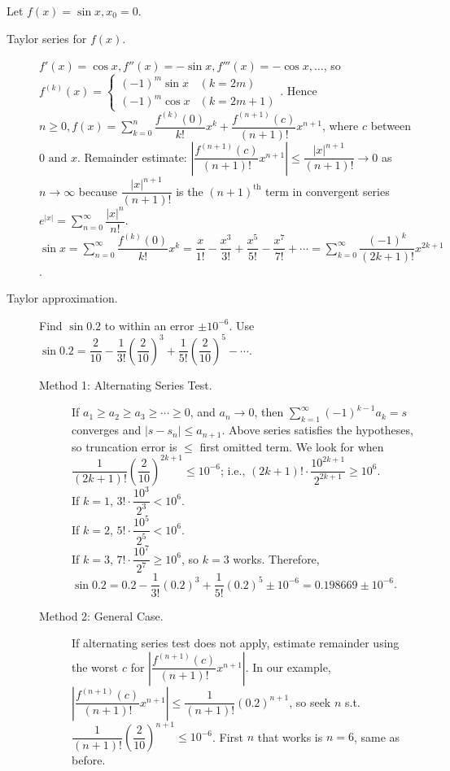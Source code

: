 \begin{example}
	Let $f(x)=\sin{x}, x_0=0$.
	\begin{description}
		\item[Taylor series for $f(x)$.]
		      $f'(x)=\cos{x}, f''(x)=-\sin{x}, f'''(x)=-\cos{x},\ldots $, so
		      $f^{(k)}(x)=\begin{cases}
				      (-1)^{m}\sin{x}  & (k=2m)   \\
				      (-1)^{m} \cos{x} & (k=2m+1)
			      \end{cases}$.
		      Hence $n\ge 0, f(x)= \sum_{k=0}^{n}{\dfrac{f^{(k)}(0)}{k!}}x^{k}+\dfrac{f^{(n+1)}(c)}{(n+1)!}x^{n+1}$, where $c$ between $0 \text{ and } x$.
		      Remainder estimate: $\left|\dfrac{f^{(n+1)}(c)}{(n+1)!}x^{n+1} \right|\le \dfrac{ \left| x \right| ^{n+1} }{(n+1)!} \to 0$ as $n\to \infty$ because $\dfrac{|x|^{n+1}}{(n+1)!}$ is the $(n+1)^{\text{th}}$ term in convergent series $e^{|x|}=\sum_{n=0}^{\infty}{\dfrac{|x|^{n}}{n!}}$.
		      \\$\sin{x}= \sum_{n=0}^{\infty}{\dfrac{f^{(k)}(0)}{k!}x^{k}}=\dfrac{x}{1!}-\dfrac{x^3}{3!}+\dfrac{x^{5}}{5!}-\dfrac{x^{7}}{7!}+ \cdots=\sum_{k=0}^{\infty}{\dfrac{(-1)^{k}}{(2k+1)!}x^{2k+1}}$.
		\item [Taylor approximation.]
		      Find $\sin{0.2}$ to within an error $\pm 10^{-6}$.
		      Use $\sin{0.2}=\dfrac{2}{10}-\dfrac{1}{3!}(\dfrac{2}{10})^{3}+\dfrac{1}{5!}(\dfrac{2}{10})^{5}- \cdots$.
		      \begin{description}
			      \item[Method 1: Alternating Series Test.]
			            If $a_1\ge a_2\ge a_3\ge  \cdots \ge 0$, and $a_{n}\to 0$, then $\sum_{k=1}^{\infty}{(-1)^{k-1}a_{k}}=s$ converges and $|s-s_{n}|\le a_{n+1}$.
			            Above series satisfies the hypotheses, so truncation error is $\le $ first omitted term. We look for when $\dfrac{1}{(2k+1)!}(\dfrac{2}{10})^{2k+1}\le 10^{-6}$; i.e., $(2k+1)! \cdot \dfrac{10^{2k+1}}{2^{2k+1}}\ge 10^{6}$.\\
			            If $k=1$, $3! \cdot \dfrac{10^{3}}{2^{3}}< 10^{6}$.\\
			            If $k=2$, $5! \cdot \dfrac{10^{5}}{2^{5}}< 10^{6}$.\\
			            If $k=3$, $7! \cdot \dfrac{10^{7}}{2^{7}}\ge 10^{6}$, so $k=3$ works.
			            Therefore, $\sin{0.2}=0.2-\dfrac{1}{3!}(0.2)^{3}+\dfrac{1}{5!}(0.2)^{5}\pm 10^{-6}=0.198669\pm 10^{-6}$.
			      \item[Method 2: General Case.]
			            If alternating series test does not apply, estimate remainder using the worst $c$ for $\left| \dfrac{f^{(n+1)}(c)}{(n+1)!}x^{n+1}\right|$. In our example, $\left| \dfrac{f^{(n+1)}(c)}{(n+1)!} x^{n+1}\right|\le \dfrac{1}{(n+1)!}(0.2)^{n+1}$, so seek $n$ s.t. $\dfrac{1}{(n+1)!}\left(\dfrac{2}{10}\right)^{n+1}\le 10^{-6}$. First $n$ that works is $n=6$, same as before.
		      \end{description}
	\end{description}
\end{example}



